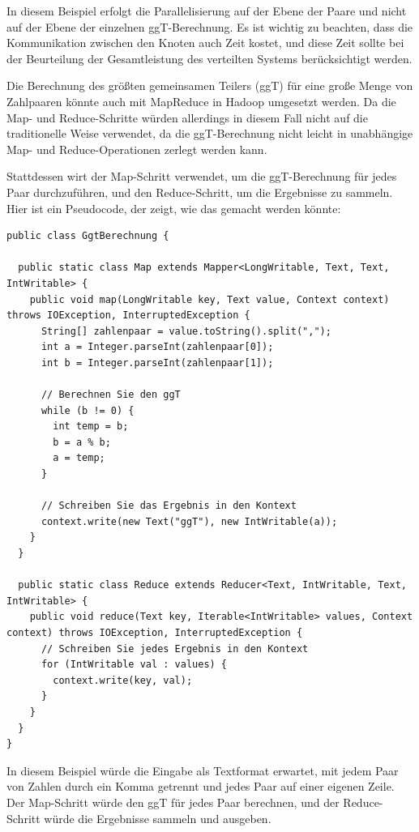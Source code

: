 In diesem Beispiel erfolgt die Parallelisierung auf der Ebene der Paare und nicht auf der Ebene der einzelnen ggT-Berechnung. Es ist wichtig zu beachten, dass die Kommunikation zwischen den Knoten auch Zeit kostet, und diese Zeit sollte bei der Beurteilung der Gesamtleistung des verteilten Systems berücksichtigt werden.

Die Berechnung des größten gemeinsamen Teilers (ggT) für eine große Menge von Zahlpaaren könnte auch mit MapReduce in Hadoop umgesetzt werden. Da die Map- und Reduce-Schritte würden allerdings in diesem Fall nicht auf die traditionelle Weise verwendet, da die ggT-Berechnung nicht leicht in unabhängige Map- und Reduce-Operationen zerlegt werden kann.

Stattdessen wirt der Map-Schritt verwendet, um die ggT-Berechnung für jedes Paar durchzuführen, und den Reduce-Schritt, um die Ergebnisse zu sammeln. Hier ist ein Pseudocode, der zeigt, wie das gemacht werden könnte:

\begin{lstlisting}[caption={Map- und Reduce},captionpos=b,label={lst:spark}]
public class GgtBerechnung {

  public static class Map extends Mapper<LongWritable, Text, Text, IntWritable> {
    public void map(LongWritable key, Text value, Context context) throws IOException, InterruptedException {
      String[] zahlenpaar = value.toString().split(",");
      int a = Integer.parseInt(zahlenpaar[0]);
      int b = Integer.parseInt(zahlenpaar[1]);
      
      // Berechnen Sie den ggT
      while (b != 0) {
        int temp = b;
        b = a % b;
        a = temp;
      }
      
      // Schreiben Sie das Ergebnis in den Kontext
      context.write(new Text("ggT"), new IntWritable(a));
    }
  }

  public static class Reduce extends Reducer<Text, IntWritable, Text, IntWritable> {
    public void reduce(Text key, Iterable<IntWritable> values, Context context) throws IOException, InterruptedException {
      // Schreiben Sie jedes Ergebnis in den Kontext
      for (IntWritable val : values) {
        context.write(key, val);
      }
    }
  }
}
\end{lstlisting}

In diesem Beispiel würde die Eingabe als Textformat erwartet, mit jedem Paar von Zahlen durch ein Komma getrennt und jedes Paar auf einer eigenen Zeile. Der Map-Schritt würde den ggT für jedes Paar berechnen, und der Reduce-Schritt würde die Ergebnisse sammeln und ausgeben. 

